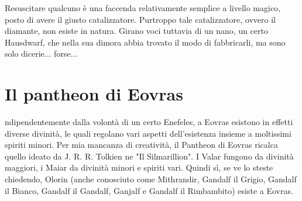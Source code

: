 Resuscitare qualcuno è una faccenda relativamente semplice a livello magico, posto di avere il giusto catalizzatore. Purtroppo tale catalizzatore, ovvero il diamante, non esiste in natura. Girano voci tuttavia di un nano, un certo Hausdwarf, che nella sua dimora abbia trovato il modo di fabbricarli, ma sono solo dicerie... forse...

\section{Il pantheon di Eovras}

ndipendentemente dalla volontà di un certo Enefeles, a Eovras esistono in effetti diverse divinità, le quali regolano vari aspetti dell'esistenza insieme a moltissimi spiriti minori. Per mia mancanza di creatività, il Pantheon di Eovras ricalca quello ideato da J. R. R. Tolkien ne "Il Silmarillion". I Valar fungono da divinità maggiori, i Maiar da divinità minori e spiriti vari. Quindi sì, se ve lo steste chiedendo, Olorin (anche conosciuto come Mithrandir, Gandalf il Grigio, Gandalf il Bianco, Gandalf il Gandalf, Ganjalf e Gandalf il Rimbambito) esiste a Eovras.